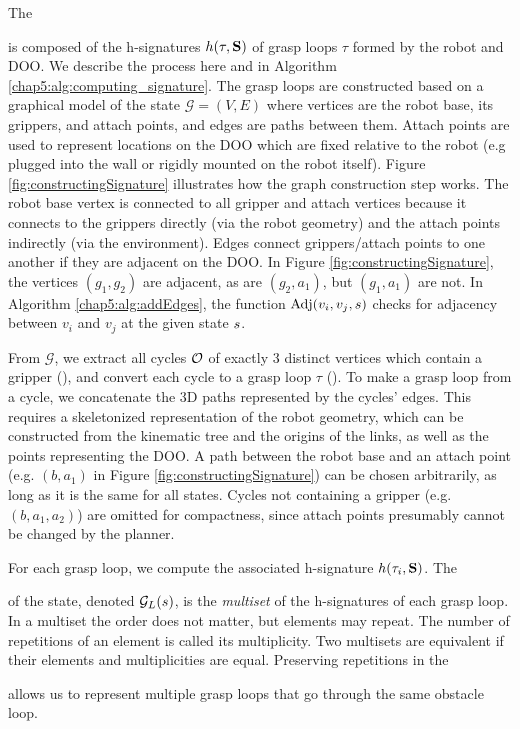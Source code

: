 The \signature{} is composed of the h-signatures $h(\tau, \textbf{S})$ of grasp loops $\tau$ formed by the robot and  DOO. We describe the process here and in Algorithm \ref{chap5:alg:computing_signature}. The grasp loops are constructed based on a graphical model of the state $\mathcal{G}=(V,E)$ where vertices are the robot base, its grippers, and attach points, and edges are paths between them. Attach points are used to represent locations on the DOO which are fixed relative to the robot (e.g plugged into the wall or rigidly mounted on the robot itself). Figure \ref{fig:constructingSignature} illustrates how the graph construction step works. The robot base vertex is connected to all gripper and attach vertices because it connects to the grippers directly (via the robot geometry) and the attach points indirectly (via the environment). Edges connect grippers/attach points to one another if they are adjacent on the DOO. In Figure \ref{fig:constructingSignature}, the vertices $(g_1,g_2)$ are adjacent, as are $(g_2,a_1)$, but $(g_1,a_1)$ are not. In Algorithm \ref{chap5:alg:addEdges}, the function $\text{Adj}(v_i,v_j,s)$ checks for adjacency between $v_i$ and $v_j$ at the given state $s$.

From $\mathcal{G}$, we extract all cycles $\mathcal{O}$ of exactly 3 distinct vertices which contain a gripper (\getValidCycles), and convert each cycle to a grasp loop $\tau$ (\getLoops). To make a grasp loop from a cycle, we concatenate the 3D paths represented by the cycles' edges. This requires a skeletonized representation of the robot geometry, which can be constructed from the kinematic tree and the origins of the links, as well as the points representing the DOO. A path between the robot base and an attach point (e.g. $(b,a_1)$ in Figure \ref{fig:constructingSignature}) can be chosen arbitrarily, as long as it is the same for all states. Cycles not containing a gripper (e.g. $(b,a_1,a_2)$) are omitted for compactness, since attach points presumably cannot be changed by the planner.

For each grasp loop, we compute the associated h-signature $h(\tau_i, \textbf{S})$. The \signature{} of the state, denoted ${\mathcal{G}_L}(s)$, is the \textit{multiset} of the h-signatures of each grasp loop. In a multiset the order does not matter, but elements may repeat. The number of repetitions of an element is called its multiplicity. Two multisets are equivalent if their elements and multiplicities are equal. Preserving repetitions in the \signature{} allows us to represent multiple grasp loops that go through the same obstacle loop.

